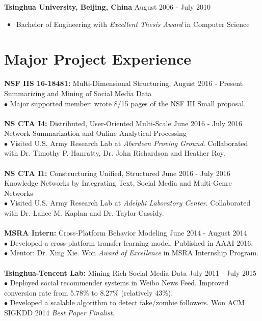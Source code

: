\documentclass[margin, 10pt]{res}
\begin{document}
\begin{resume}
{\bf Tsinghua University, Beijing, China} \hfill {August 2006 - July 2010}
\begin{itemize} \itemsep -2pt
\item Bachelor of Engineering with {\em Excellent Thesis Award} in Computer Science
\end{itemize}


\section{Major Project Experience}

{\textbf{NSF IIS 16-18481:} Multi-Dimensional Structuring,} \hfill {August 2016 - Present} \\
{Summarizing and Mining of Social Media Data} \hfill {} \\
$\bullet$ Major supported member: wrote 8/15 pages of the NSF III Small proposal. \\ \\
{\textbf{NS CTA I4:} Distributed, User-Oriented Multi-Scale} \hfill {June 2016 - July 2016} \\
{Network Summarization and Online Analytical Processing} \hfill {} \\
$\bullet$ Visited U.S. Army Research Lab at \textit{Aberdeen Proving Ground}.
Collaborated with Dr. Timothy P. Hanratty, Dr. John Richardson and Heather Roy. \\ \\
{\textbf{NS CTA I1:} Constructuring Unified, Structured} \hfill {June 2016 - July 2016} \\
{Knowledge Networks by Integrating Text, Social Media and Multi-Genre Networks} \hfill {} \\
$\bullet$ Visited U.S. Army Research Lab at \textit{Adelphi Laboratory Center}. Collaborated with Dr. Lance M. Kaplan and Dr. Taylor Cassidy. \\ \\
{\textbf{MSRA Intern:} Cross-Platform Behavior Modeling} \hfill {June 2014 - August 2014} \\
$\bullet$ Developed a cross-platform transfer learning model. Published in AAAI 2016. \\
$\bullet$ Mentor: Dr. Xing Xie. Won \textit{Award of Excellence} in MSRA Internship Program. \\ \\
{\textbf{Tsinghua-Tencent Lab:} Mining Rich Social Media Data} \hfill {July 2011 - July 2015} \\
$\bullet$ Deployed social recommender systems in Weibo News Feed. Improved conversion rate from 5.78\% to 8.27\% (relatively 43\%). \\
$\bullet$ Developed a scalable algorithm to detect fake/zombie followers. Won ACM SIGKDD 2014 \textit{Best Paper Finalist}.


\end{resume}
\end{document}
